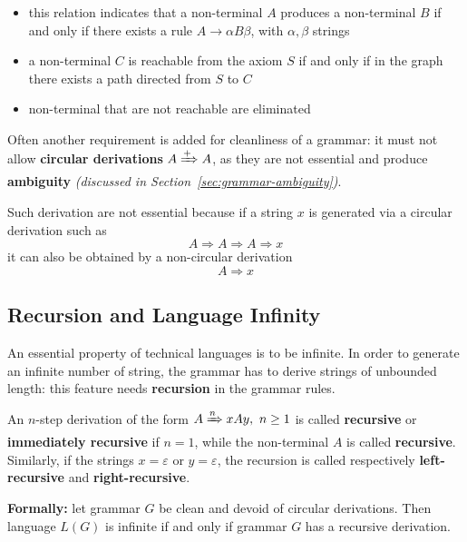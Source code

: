 \documentclass[english]{article}
\begin{document}
\begin{enumerate}[label=\textbf{step \arabic*}:, ref=(\textbf{\arabic*}), left=20pt]
        \begin{itemize}
          \item this relation indicates that a non-terminal \(A\) produces a non-terminal \(B\) if and only if there exists a rule \(A \rightarrow \alpha B \beta\), with \(\alpha, \beta\) strings
          \item a non-terminal \(C\) is reachable from the axiom \(S\) if and only if in the graph there exists a path directed from \(S\) to \(C\)
          \item non-terminal that are not reachable are eliminated
        \end{itemize}
\end{enumerate}

\bigskip
Often another requirement is added for cleanliness of a grammar: it must not allow \textbf{circular derivations} \(A \xRightarrow{+} A\), as they are not essential and produce \textbf{ambiguity} \textit{(discussed in Section~\ref{sec:grammar-ambiguity})}.

Such derivation are not essential because if a string \(x\) is generated via a circular derivation such as
\[ A \Rightarrow A \Rightarrow A \Rightarrow x \]
it can also be obtained by a non-circular derivation
\[ A \Rightarrow x \]

\subsection{Recursion and Language Infinity}

An essential property of technical languages is to be infinite.
In order to generate an infinite number of string, the grammar has to derive strings of unbounded length:
this feature needs \textbf{recursion} in the grammar rules.

An \(n\)-step derivation of the form \(A \xRightarrow{n} x A y, \ n \geq 1\) is called \textbf{recursive} or \textbf{immediately recursive} if \(n=1\), while the non-terminal \(A\) is called \textbf{recursive}.
Similarly, if the strings \(x=\varepsilon\) or \(y=\varepsilon\), the recursion is called respectively \textbf{left-recursive} and \textbf{right-recursive}.

\bigskip
\textbf{Formally:} let grammar \(G\) be clean and devoid of circular derivations.
Then language \(L(G)\) is infinite if and only if grammar \(G\) has a recursive derivation.
\end{document}
